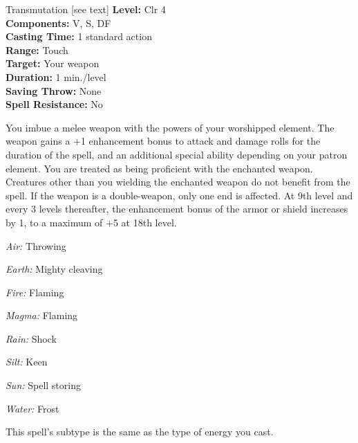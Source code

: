 {Transmutation [see text]}
{
	\textbf{Level:}
	Clr 4\\
	\textbf{Components:}
	V, S, DF\\
	\textbf{Casting Time:}
	1 standard action\\
	\textbf{Range:}
	Touch\\
	\textbf{Target:}
	Your weapon\\
	\textbf{Duration:}
	1 min./level\\
	\textbf{Saving Throw:}
	None\\
	\textbf{Spell Resistance:}
	No\\
}
{
	You imbue a melee weapon with the powers of your worshipped element. The weapon gains a +1 enhancement bonus to attack and damage rolls for the duration of the spell, and an additional special ability depending on your patron element. You are treated as being proficient with the enchanted weapon. Creatures other than you wielding the enchanted weapon do not benefit from the spell. If the weapon is a double-weapon, only one end is affected. At 9th level and every 3 levels thereafter, the enhancement bonus of the armor or shield increases by 1, to a maximum of +5 at 18th level.
	\begin{itemize*}
	\item \textit{Air:} Throwing
	\item \textit{Earth:} Mighty cleaving
	\item \textit{Fire:} Flaming
	\item \textit{Magma:} Flaming
	\item \textit{Rain:} Shock
	\item \textit{Silt:} Keen
	\item \textit{Sun:} Spell storing
	\item \textit{Water:} Frost
	\end{itemize*}

	This spell's subtype is the same as the type of energy you cast.
}

